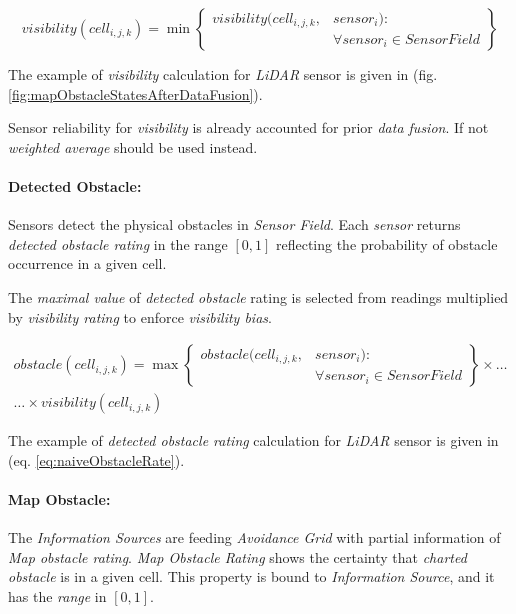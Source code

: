 \begin{equation}\label{eq:visibilityForCell}
    visibility(cell_{i,j,k}) = \min \left\{\begin{aligned}visibility(cell_{i,j,k},&sensor_i):\\&\forall sensor_i \in Sensor Field\end{aligned}\right\}
\end{equation}

\noindent The example of \emph{visibility} calculation for \emph{LiDAR} sensor is given in (fig. \ref{fig:mapObstacleStatesAfterDataFusion}).

\begin{note}
    Sensor reliability for \emph{visibility} is already accounted for prior \emph{data fusion}. If not \emph{weighted average} should be used instead. 
\end{note}

\paragraph{Detected Obstacle:} Sensors detect the physical obstacles  in \emph{Sensor Field}. Each \emph{sensor} returns \emph{detected obstacle rating} in the range $[0,1]$ reflecting the probability of obstacle occurrence in a given  cell.

The \emph{maximal value} of \emph{detected obstacle} rating is selected from readings multiplied by \emph{visibility rating} to enforce \emph{visibility bias}.

\begin{multline}\label{eq:detectedObstacleRatingForCell}
    obstacle(cell_{i,j,k}) = \max \left\{\begin{aligned}obstacle(cell_{i,j,k},&sensor_i):\\&\forall sensor_i \in SensorField\end{aligned}\right\}\times\dots\\\dots\times visibility(cell_{i,j,k})
\end{multline}

\noindent The example of \emph{detected obstacle rating} calculation for \emph{LiDAR} sensor is given in (eq. \ref{eq:naiveObstacleRate}).

\paragraph{Map Obstacle:} The \emph{Information Sources} are feeding \emph{Avoidance Grid} with partial information of \emph{Map obstacle rating}. \emph{Map Obstacle Rating} shows the certainty that \emph{charted obstacle} is in a given cell. This property is bound to \emph{Information Source}, and it has the \emph{range} in  $[0,1]$.

